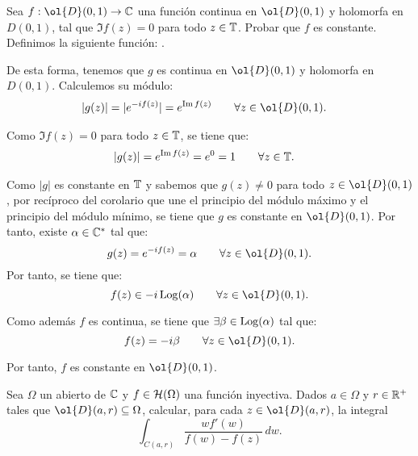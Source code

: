 \begin{ejercicio}
    Sea $f : \ol{D}(0,1) \to \bb{C}$ una función continua en $\ol{D}(0,1)$ y holomorfa en $D(0,1)$, tal que $\Im f(z) = 0$ para todo $z\in \mathbb{T}$. Probar que $f$ es constante.\\

    Definimos la siguiente función:
    .

    De esta forma, tenemos que $g$ es continua en $\ol{D}(0,1)$ y holomorfa en $D(0,1)$. Calculemos su módulo:
    \begin{align*}
        |g(z)| &= |e^{-i f(z)}| = e^{\Im f(z)}\qquad \forall z\in \ol{D}(0,1).
    \end{align*}

    Como $\Im f(z) = 0$ para todo $z\in \mathbb{T}$, se tiene que:
    \begin{align*}
        |g(z)| &= e^{\operatorname{Im} f(z)} = e^{0} = 1\qquad \forall z\in \mathbb{T}.
    \end{align*}

    Como $|g|$ es constante en $\mathbb{T}$ y sabemos que $g(z) \neq 0$ para todo $z\in \ol{D}(0,1)$, por recíproco del corolario que une el principio del módulo máximo y el principio del módulo mínimo, se tiene que $g$ es constante en $\ol{D}(0,1)$. Por tanto, existe $\alpha\in \mathbb{C}^*$ tal que:
    \begin{equation*}
        g(z) = e^{-i f(z)} = \alpha \qquad \forall z\in \ol{D}(0,1).
    \end{equation*}
    Por tanto, se tiene que:
    \begin{equation*}
        f(z) \in -i \Log(\alpha) \qquad \forall z\in \ol{D}(0,1).
    \end{equation*}

    Como además $f$ es continua, se tiene que $\exists \beta\in \operatorname{Log}(\alpha)$ tal que:
    \begin{equation*}
        f(z) = -i\beta \qquad \forall z\in \ol{D}(0,1).
    \end{equation*}

    Por tanto, $f$ es constante en $\ol{D}(0,1)$.
\end{ejercicio}

\begin{ejercicio}
    Sea $\Omega$ un abierto de $\mathbb{C}$ y $f\in \mathcal{H}(\Omega)$ una función inyectiva. Dados $a\in \Omega$ y $r\in \mathbb{R}^+$ tales que $\ol{D}(a,r) \subseteq \Omega$, calcular, para cada $z\in \ol{D}(a,r)$, la integral
    \begin{equation*}
        \int_{C(a,r)} \frac{w f'(w)}{f(w) - f(z)} \, dw.
    \end{equation*}
\end{ejercicio}